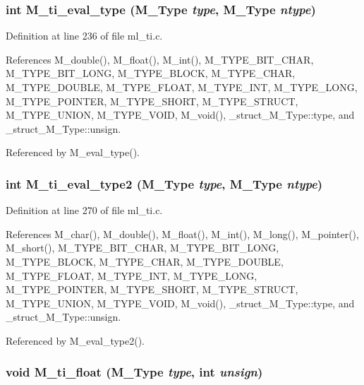 \subsubsection{\setlength{\rightskip}{0pt plus 5cm}int M\_\-ti\_\-eval\_\-type (\bf{M\_\-Type} {\em type}, \bf{M\_\-Type} {\em ntype})}\label{m__ti_8h_6856ac6a1fe6d45d21afa1c9d289ce7c}




Definition at line 236 of file ml\_\-ti.c.

References M\_\-double(), M\_\-float(), M\_\-int(), M\_\-TYPE\_\-BIT\_\-CHAR, M\_\-TYPE\_\-BIT\_\-LONG, M\_\-TYPE\_\-BLOCK, M\_\-TYPE\_\-CHAR, M\_\-TYPE\_\-DOUBLE, M\_\-TYPE\_\-FLOAT, M\_\-TYPE\_\-INT, M\_\-TYPE\_\-LONG, M\_\-TYPE\_\-POINTER, M\_\-TYPE\_\-SHORT, M\_\-TYPE\_\-STRUCT, M\_\-TYPE\_\-UNION, M\_\-TYPE\_\-VOID, M\_\-void(), \_\-struct\_\-M\_\-Type::type, and \_\-struct\_\-M\_\-Type::unsign.

Referenced by M\_\-eval\_\-type().
\subsubsection{\setlength{\rightskip}{0pt plus 5cm}int M\_\-ti\_\-eval\_\-type2 (\bf{M\_\-Type} {\em type}, \bf{M\_\-Type} {\em ntype})}\label{m__ti_8h_e6b3ba73eda8743a3e29607bc070ba26}




Definition at line 270 of file ml\_\-ti.c.

References M\_\-char(), M\_\-double(), M\_\-float(), M\_\-int(), M\_\-long(), M\_\-pointer(), M\_\-short(), M\_\-TYPE\_\-BIT\_\-CHAR, M\_\-TYPE\_\-BIT\_\-LONG, M\_\-TYPE\_\-BLOCK, M\_\-TYPE\_\-CHAR, M\_\-TYPE\_\-DOUBLE, M\_\-TYPE\_\-FLOAT, M\_\-TYPE\_\-INT, M\_\-TYPE\_\-LONG, M\_\-TYPE\_\-POINTER, M\_\-TYPE\_\-SHORT, M\_\-TYPE\_\-STRUCT, M\_\-TYPE\_\-UNION, M\_\-TYPE\_\-VOID, M\_\-void(), \_\-struct\_\-M\_\-Type::type, and \_\-struct\_\-M\_\-Type::unsign.

Referenced by M\_\-eval\_\-type2().
\subsubsection{\setlength{\rightskip}{0pt plus 5cm}void M\_\-ti\_\-float (\bf{M\_\-Type} {\em type}, int {\em unsign})}\label{m__ti_8h_470700be28327137b93ff17d43451e6e}




